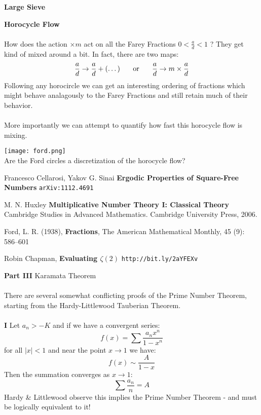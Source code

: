 \documentclass[12pt]{article}
\begin{document}
\newpage

\noindent \textbf{Large Sieve}

\newpage

\noindent \textbf{Horocycle Flow} \\ \\
How does the action $\times m $ act on all the Farey Fractions $0 < \frac{a}{d} < 1$ ? They get kind of mixed around a bit.   In fact, there are two maps:
$$ \frac{a}{d} \to \frac{a}{d} + (\dots) \hspace{0.25in}\text{or}\hspace{0.25in} \frac{a}{d} \to m \times \frac{a}{d} $$
Following any horocircle we can get an interesting ordering of fractions which might behave analagously to the Farey Fractions and still retain much of their behavior.  \\ \\
More importantly we can attempt to quantify how fast this horocycle flow is mixing.

\texttt{[image: ford.png]} \\
Are the Ford circles a discretization of the horocycle flow?

\newpage

\selectfont \fontsize{12}{10}\selectfont

\begin{thebibliography}{}

\item Francesco Cellarosi, Yakov G. Sinai \textbf{Ergodic Properties of Square-Free Numbers} \texttt{arXiv:1112.4691}

\item M. N. Huxley \textbf{Multiplicative Number Theory I: Classical Theory} Cambridge Studies in Advanced Mathematics.  Cambridge University Press, 2006.

\item  Ford, L. R. (1938), \textbf{Fractions}, The American Mathematical Monthly, 45 (9): 586–601

\item Robin Chapman, \textbf{Evaluating $\zeta(2)$} \texttt{http://bit.ly/2aYFEXv}

\end{thebibliography}

\newpage

\selectfont \fontsize{25}{30}\selectfont

\noindent \textbf{Part III} Karamata Theorem \\ \\
There are several somewhat conflicting proofs of the Prime Number Theorem, starting from the Hardy-Littlewood Tauberian Theorem. \\ \\
\textbf{I} Let $a_n > -K$ and if we have a convergent series:
$$ f(x) = \sum \frac{a_n x^n}{1-x^n}$$
for all $|x|<1$ and near the point $x \to 1$ we have:
$$ f(x) \sim \frac{A}{1-x} $$
Then the summation converges as $x \to 1$:
$$ \sum \frac{a_n}{n} = A $$
Hardy \& Littlewood observe this implies the Prime Number Theorem - and must be logically equivalent to it! 
\end{document}
